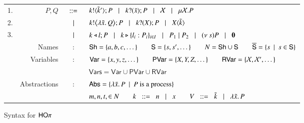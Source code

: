 \begin{figure}[t!]
		\begin{tabular}{lrcl}
			1. &	$P,Q$
			 	&$\;\;::=\;\;$&	$k ! \langle \tilde{k}' \rangle ; P \;\;\;|\;\;\; k ? (\tilde{x}) ; P \;\;\;|\;\;\; \mathcal{X} \;\;\;|\;\;\; \mu \mathcal{X}. P$ \\
			2. & 	&$\;\;\;|\;\;\;$&	$k ! \big\langle \lambda \tilde{x}.\,Q \big\rangle ; P \;\;\;|\;\;\; k ? (X) ; P \;\;\;|\;\;\; X\langle \tilde{k} \rangle$ \\ 
			3. & 	&$\;\;\;|\;\;\;$&	$k \triangleleft l ; P \;\;\;|\;\;\; k \triangleright \{l_i:P_i\}_{i \in I} \;\;\;|\;\;\; 
						P_1 \;|\; P_2 \;\;\;|\;\;\; (\nu\ s) P \;\;\;|\;\;\; \mathbf{0}$ \\
		&	Names & : & 	$\mathsf{Sh} = \{a, b, c, \dots\} \qquad \mathsf{S} = \{s, s', \dots\} \qquad N = \mathsf{Sh} \cup \mathsf{S}
					\qquad \overline{\mathsf{S}} = \{s \ \ |\ \  s \in \mathsf{S}\}$\\
		&	Variables & : &	$\mathsf{Var} = \{x,y,z, \dots\} \qquad \mathsf{PVar} = \{X, Y, Z, \dots\}
					\qquad \mathsf{RVar} = \{\mathcal{X}, \mathcal{X}', \dots\}$\\
		&		& &	$\mathsf{Vars} = \mathsf{Var} \cup \mathsf{PVar} \cup \mathsf{RVar}$\\
		&	Abstractions & : & $\mathsf{Abs} = \{\lambda \tilde{x}.\,P \ \ |\ \  P \textrm{ is a process}\}$\\
		&		& &	$m, n, t, \in N \qquad k \;\;::=\;\; n \;\;\;|\;\;\; x \qquad V \;\;::=\;\; \tilde{k} \;\;\;|\;\;\; \lambda \tilde{x}.\,P$
		\end{tabular}
	\caption{Syntax for $\mathsf{HO}\pi$ \label{fig:syntax}}
\end{figure}

